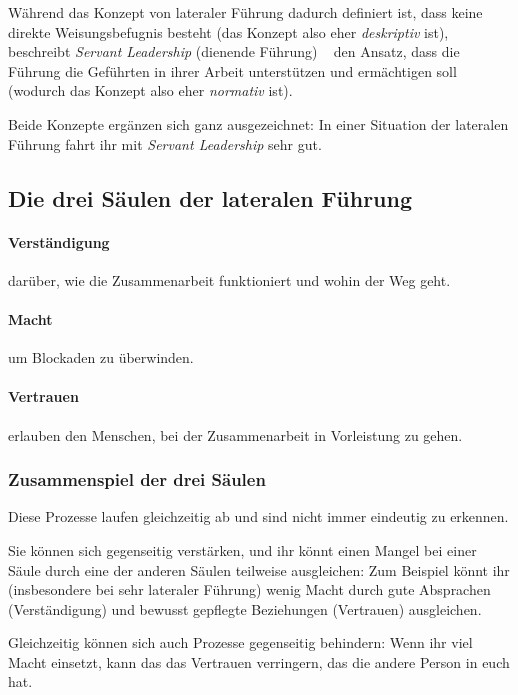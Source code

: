 Während das Konzept von lateraler Führung dadurch definiert ist, dass keine direkte Weisungsbefugnis besteht (das Konzept also eher \emph{deskriptiv} ist), beschreibt \emph{Servant Leadership} (\glqq dienende Führung\grqq) ~\cite{fuehren-durch-dienen} den Ansatz, dass die Führung die Geführten in ihrer Arbeit unterstützen und ermächtigen soll (wodurch das Konzept also eher \emph{normativ} ist).

Beide Konzepte ergänzen sich ganz ausgezeichnet: In einer Situation der lateralen Führung fahrt ihr mit \emph{Servant Leadership} sehr gut.


\subsection{Die drei Säulen der lateralen Führung}

\paragraph{Verständigung} darüber, wie die Zusammenarbeit funktioniert und wohin der Weg geht.

\paragraph{Macht} um Blockaden zu überwinden.

\paragraph{Vertrauen} erlauben den Menschen, bei der Zusammenarbeit in Vorleistung zu gehen.


\subsubsection{Zusammenspiel der drei Säulen}

Diese Prozesse laufen gleichzeitig ab und sind nicht immer eindeutig zu erkennen.

Sie können sich gegenseitig verstärken, und ihr könnt einen Mangel bei einer Säule durch eine der anderen Säulen teilweise ausgleichen: Zum Beispiel könnt ihr (insbesondere bei sehr lateraler Führung) wenig Macht durch gute Absprachen (Verständigung) und bewusst gepflegte Beziehungen (Vertrauen) ausgleichen.

Gleichzeitig können sich auch Prozesse gegenseitig behindern: Wenn ihr viel Macht einsetzt, kann das das Vertrauen verringern, das die andere Person in euch hat.

